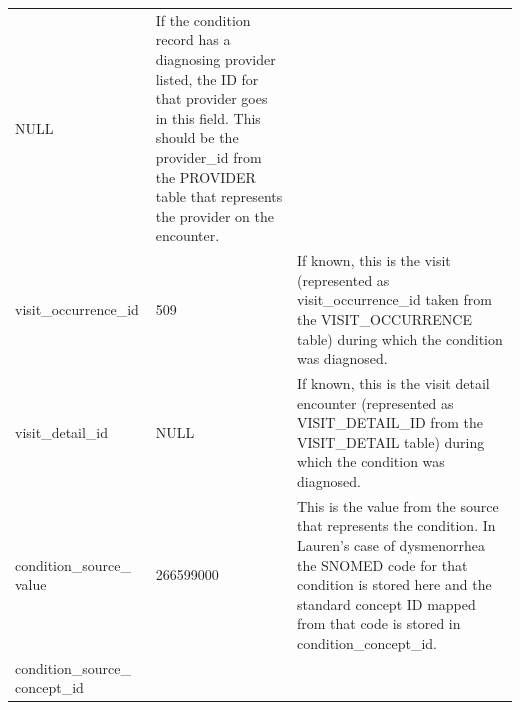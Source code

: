 \documentclass[11pt]{book}
\theoremstyle{definition}
\theoremstyle{definition}
\theoremstyle{definition}
\theoremstyle{remark}
\begin{document}
\begin{longtable}[]{@{}lll@{}}
\begin{minipage}[t]{0.15\columnwidth}
NULL\strut
\end{minipage} & \begin{minipage}[t]{0.49\columnwidth}\raggedright
If the condition record has a diagnosing provider listed, the ID for that provider goes in this field. This should be the provider\_id from the PROVIDER table that represents the provider on the encounter.\strut
\end{minipage}\tabularnewline
\begin{minipage}[t]{0.28\columnwidth}\raggedright
visit\_occurrence\_id\strut
\end{minipage} & \begin{minipage}[t]{0.15\columnwidth}\raggedright
509\strut
\end{minipage} & \begin{minipage}[t]{0.49\columnwidth}\raggedright
If known, this is the visit (represented as visit\_occurrence\_id taken from the VISIT\_OCCURRENCE table) during which the condition was diagnosed.\strut
\end{minipage}\tabularnewline
\begin{minipage}[t]{0.28\columnwidth}\raggedright
visit\_detail\_id\strut
\end{minipage} & \begin{minipage}[t]{0.15\columnwidth}\raggedright
NULL\strut
\end{minipage} & \begin{minipage}[t]{0.49\columnwidth}\raggedright
If known, this is the visit detail encounter (represented as VISIT\_DETAIL\_ID from the VISIT\_DETAIL table) during which the condition was diagnosed.\strut
\end{minipage}\tabularnewline
\begin{minipage}[t]{0.28\columnwidth}\raggedright
condition\_source\_ value\strut
\end{minipage} & \begin{minipage}[t]{0.15\columnwidth}\raggedright
266599000\strut
\end{minipage} & \begin{minipage}[t]{0.49\columnwidth}\raggedright
This is the value from the source that represents the condition. In Lauren's case of dysmenorrhea the SNOMED code for that condition is stored here and the standard concept ID mapped from that code is stored in condition\_concept\_id.\strut
\end{minipage}\tabularnewline
\begin{minipage}[t]{0.28\columnwidth}\raggedright
condition\_source\_ concept\_id\strut

\end{minipage}
\end{longtable}
\end{document}
